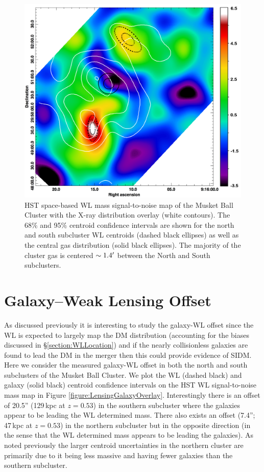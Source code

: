 \begin{figure}
\centering
\includegraphics[width=5in]{Chapter4/LensingXrayOverlay.png}
\caption[Musket Ball Cluster weak lensing signal-to-noise map with X-ray map overlay, including centroid locations.]{
HST space-based WL mass signal-to-noise map of the Musket Ball Cluster with the X-ray distribution overlay (white contours).
The 68\% and 95\% centroid confidence intervals are shown for the north and south subcluster WL centroids (dashed black ellipses) as well as the central gas distribution (solid black ellipses).
The majority of the cluster gas is centered $\sim1.4\mbox{$^\prime$}$ between the North and South subclusters.
}
\label{figure:LensingXrayOverlay}
\end{figure}


\section{Galaxy--Weak Lensing Offset}\label{section:GalaxyWLOffset}

As discussed previously it is interesting to study the galaxy-WL offset since the WL is expected to largely map the DM distribution (accounting for the biases discussed in \S\ref{section:WLLocation}) and if the nearly collisionless galaxies are found to lead the DM in the merger then this could provide evidence of SIDM.
Here we consider the measured galaxy-WL offset in both the north and south subclusters of the Musket Ball Cluster.
We plot the WL (dashed black) and galaxy (solid black)  centroid confidence intervals on the HST WL signal-to-noise mass map in Figure \ref{figure:LensingGalaxyOverlay}.
Interestingly there is an offset of 20.5'' (129\,kpc at $z=0.53$) in the southern subcluster where the galaxies appear to be leading the WL determined mass.
There also exists an offset (7.4''; 47\,kpc at $z=0.53$) in the northern subcluster but in the opposite direction (in the sense that the WL determined mass appears to be leading the galaxies).
As noted previously the larger centroid uncertainties in the northern cluster are primarily due to it being less massive and having fewer galaxies than the southern subcluster.

